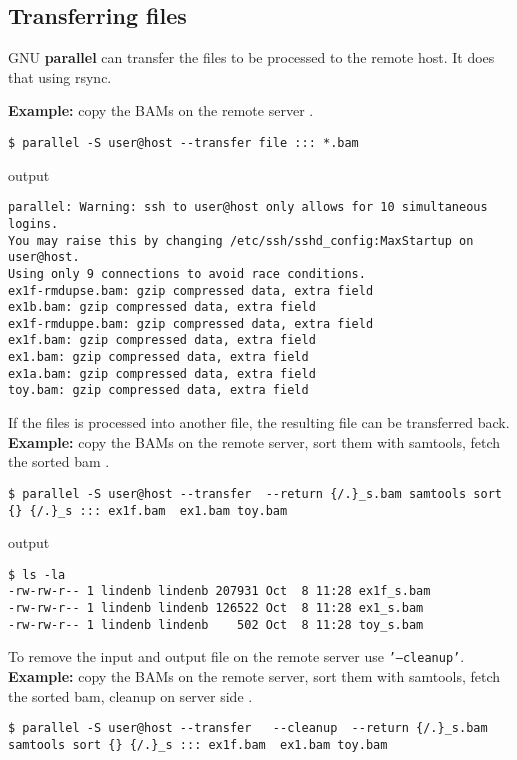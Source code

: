 \documentclass{article}
\newcommand{\example}[1]{
\textbf{Example: } {\color[rgb]{0,0,1} #1 } .
}
\newcommand{\cmdoption}[1]{\texttt{'#1'}}
\def\prl{\textbf{parallel}}
\begin{document}

\subsection{Transferring files}
GNU \prl{} can transfer the files to be processed to the remote host. It does that using rsync.
\example{copy the BAMs on the remote server}
\begin{lstlisting}
$ parallel -S user@host --transfer file ::: *.bam
\end{lstlisting}
output
\begin{lstlisting}
parallel: Warning: ssh to user@host only allows for 10 simultaneous logins.
You may raise this by changing /etc/ssh/sshd_config:MaxStartup on user@host.
Using only 9 connections to avoid race conditions.
ex1f-rmdupse.bam: gzip compressed data, extra field
ex1b.bam: gzip compressed data, extra field
ex1f-rmduppe.bam: gzip compressed data, extra field
ex1f.bam: gzip compressed data, extra field
ex1.bam: gzip compressed data, extra field
ex1a.bam: gzip compressed data, extra field
toy.bam: gzip compressed data, extra field
\end{lstlisting}

If the files is processed into another file, the resulting file can be transferred back.\\
\example{copy the BAMs on the remote server, sort them with samtools, fetch the sorted bam}
\begin{lstlisting}
$ parallel -S user@host --transfer  --return {/.}_s.bam samtools sort {} {/.}_s ::: ex1f.bam  ex1.bam toy.bam
\end{lstlisting}
output
\begin{lstlisting}
$ ls -la
-rw-rw-r-- 1 lindenb lindenb 207931 Oct  8 11:28 ex1f_s.bam
-rw-rw-r-- 1 lindenb lindenb 126522 Oct  8 11:28 ex1_s.bam
-rw-rw-r-- 1 lindenb lindenb    502 Oct  8 11:28 toy_s.bam
\end{lstlisting}
To remove the input and output file on the remote server use \cmdoption{--cleanup}.\\
\example{copy the BAMs on the remote server, sort them with samtools, fetch the sorted bam, cleanup on server side}
\begin{lstlisting}
$ parallel -S user@host --transfer   --cleanup  --return {/.}_s.bam samtools sort {} {/.}_s ::: ex1f.bam  ex1.bam toy.bam
\end{lstlisting}
\end{document}
